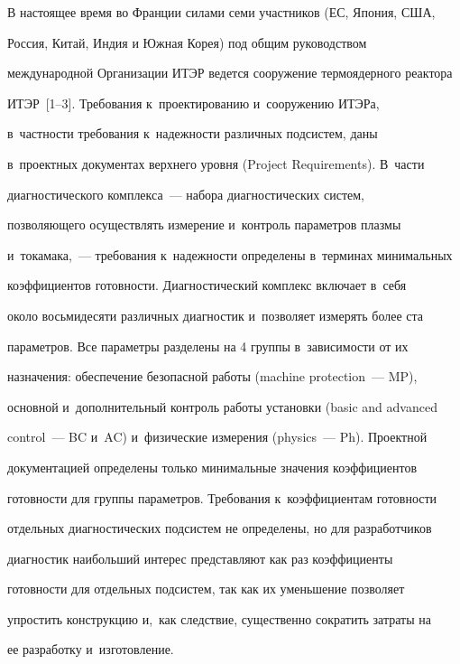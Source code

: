 \vspace*{-3pt}








В настоящее время во Франции силами семи участников (ЕС, Япония, США, 


Россия, Китай, Индия и Южная Корея) под общим руководством 


международной Организации ИТЭР ведется сооружение термоядерного реактора  


ИТЭР~[1--3]. Требования к~проектированию и~сооружению ИТЭРа, 


в~частности требования к~на\-деж\-ности различных подсистем, даны 


в~проектных документах верхнего уровня (Project Requirements). В~части 


диагностического комплекса~--- набора диагностических сис\-тем, 


позволяющего осуществлять измерение и~контроль параметров плазмы 


и~токамака,~--- требования к~на\-деж\-ности определены в~терминах минимальных 


коэффициентов готовности. Диагностический комплекс включает в~себя 


около восьмидесяти различных диагностик и~позволяет измерять более ста 


параметров. Все параметры разделены на 4 группы в~зависимости от их 


назначения: обеспечение безопас\-ной работы  (machine protection~--- MP), 


основной и~дополнительный контроль работы установки (basic and advanced 


control~--- BC и~AC) и~физические измерения (physics~--- Ph). Проектной 


документацией определены только минимальные значения коэффициентов 


готовности для группы па\-ра\-мет\-ров. Требования к~коэффициентам готовности 


отдельных диагностических под\-сис\-тем не определены, но для разработчиков 


диагностик наибольший интерес пред\-став\-ля\-ют как раз коэффициенты 


готовности для отдельных под\-сис\-тем, так как их уменьшение позволяет 


упростить конструкцию и,~как следствие, существенно сократить затраты на 


ее разработку и~изготовление. 





